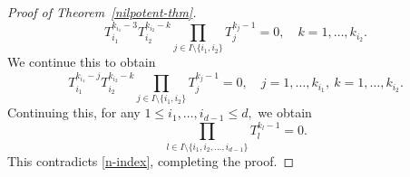 \documentclass[10pt, a4paper, oneside, reqno]{amsproc}
\numberwithin{equation}{section}
\theoremstyle{remark}
\theoremstyle{definition}
\newcommand*{\Le}{\leqslant}
\begin{document}
\begin{proof}[Proof of Theorem~\ref{nilpotent-thm}]
\begin{equation*} 
T^{k_{i_1}-3}_{i_1} T^{k_{i_2}-k}_{i_2}  \prod_{j \in I\setminus\{i_1, i_2\}} T^{k_j-1}_j=0, \quad k =1, \ldots, k_{i_2}.
\end{equation*}
We continue this to obtain
\begin{equation*} 
T^{k_{i_1}-j}_{i_1} T^{k_{i_2}-k}_{i_2}  \prod_{j \in I\setminus\{i_1, i_2\}} T^{k_j-1}_j=0, \quad j=1, \ldots, k_{i_1}, ~k =1, \ldots, k_{i_2}.
\end{equation*}
Continuing this, for any $1 \Le i_1, \ldots,  i_{d-1} \Le d,$ we obtain
$$\prod_{l \in I\setminus\{i_1, i_2, \ldots, i_{d-1}\}} T^{k_l-1}_l=0.$$ 
This contradicts \eqref{n-index}, completing the proof. 
\end{proof} 
  
\end{document}
